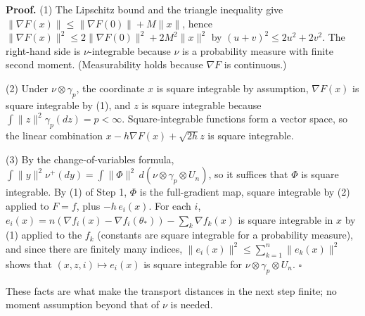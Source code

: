 \documentclass[11pt,a4paper]{article}
\begin{document}
\textbf{Proof.} (1) The Lipschitz bound and the triangle inequality give \(\|\nabla F(x)\|\le\|\nabla F(0)\|+M\|x\|\), hence \(\|\nabla F(x)\|^2\le2\|\nabla F(0)\|^2+2M^2\|x\|^2\) by \((u+v)^2\le2u^2+2v^2\). The right-hand side is \(\nu\)-integrable because \(\nu\) is a probability measure with finite second moment. (Measurability holds because \(\nabla F\) is continuous.)




(2) Under \(\nu\otimes\gamma_p\), the coordinate \(x\) is square integrable by assumption, \(\nabla F(x)\) is square integrable by (1), and \(z\) is square integrable because \(\int\|z\|^2\gamma_p(dz)=p<\infty\). Square-integrable functions form a vector space, so the linear combination \(x-h\nabla F(x)+\sqrt{2h}z\) is square integrable.




(3) By the change-of-variables formula, \(\int\|y\|^2\nu^+(dy)=\int\|\Phi\|^2\,d(\nu\otimes\gamma_p\otimes U_n)\), so it suffices that \(\Phi\) is square integrable. By (1) of Step 1, \(\Phi\) is the full-gradient map, square integrable by (2) applied to \(F=f\), plus \(-h\,e_i(x)\). For each \(i\), \(e_i(x)=n(\nabla f_i(x)-\nabla f_i(\theta_*))-\sum_k\nabla f_k(x)\) is square integrable in \(x\) by (1) applied to the \(f_k\) (constants are square integrable for a probability measure), and since there are finitely many indices, \(\|e_i(x)\|^2\le\sum_{k=1}^n\|e_k(x)\|^2\) shows that \((x,z,i)\mapsto e_i(x)\) is square integrable for \(\nu\otimes\gamma_p\otimes U_n\). \(\square\)




These facts are what make the transport distances in the next step finite; no moment assumption beyond that of \(\nu\) is needed.
\end{document}
